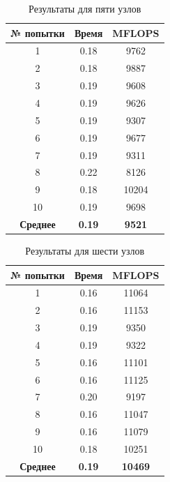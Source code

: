 \begin{table}[H]
	\caption{Результаты для пяти узлов}
	\centering
	\begin{tabular}{|c|c|c|}
		\hline
		\textbf{№ попытки} & \textbf{Время} & \textbf{MFLOPS} \\\hline
		1 & 0.18 & 9762 \\ \hline
		2 & 0.18 & 9887 \\ \hline
		3 & 0.19 & 9608 \\ \hline
		4 & 0.19 & 9626 \\ \hline
		5 & 0.19 & 9307 \\ \hline
		6 & 0.19 & 9677 \\ \hline
		7 & 0.19 & 9311 \\ \hline
		8 & 0.22 & 8126 \\ \hline
		9 & 0.18 & 10204 \\ \hline
		10 & 0.19 & 9698 \\ \hline
		\textbf{Среднее} & \textbf{0.19} & \textbf{9521} \\\hline
	\end{tabular}
	\label{res/05}
\end{table}


\begin{table}[H]
	\caption{Результаты для шести узлов}
	\centering
	\begin{tabular}{|c|c|c|}
		\hline
		\textbf{№ попытки} & \textbf{Время} & \textbf{MFLOPS} \\\hline
		1 & 0.16 & 11064 \\ \hline
		2 & 0.16 & 11153 \\ \hline
		3 & 0.19 & 9350 \\ \hline
		4 & 0.19 & 9322 \\ \hline
		5 & 0.16 & 11101 \\ \hline
		6 & 0.16 & 11125 \\ \hline
		7 & 0.20 & 9197 \\ \hline
		8 & 0.16 & 11047 \\ \hline
		9 & 0.16 & 11079 \\ \hline
		10 & 0.18 & 10251 \\ \hline
		\textbf{Среднее} & \textbf{0.19} & \textbf{10469} \\\hline
	\end{tabular}
	\label{res/06}
\end{table}


